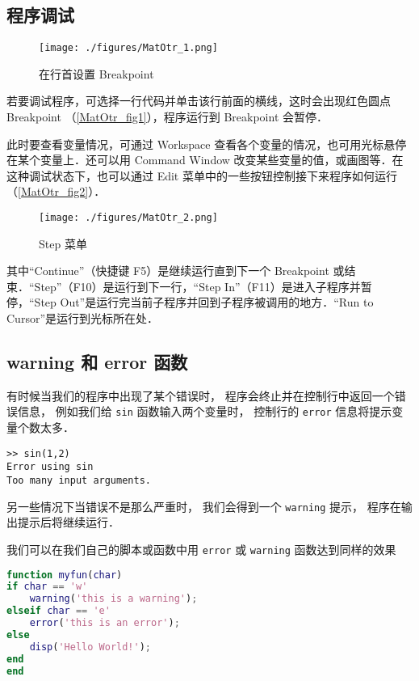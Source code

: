 

\subsection{程序调试}
\begin{figure}[ht]
\centering
\texttt{[image: ./figures/MatOtr\_1.png]}
\caption{在行首设置 Breakpoint}\label{MatOtr_fig1}
\end{figure}

若要调试程序，可选择一行代码并单击该行前面的横线，这时会出现红色圆点 Breakpoint （\autoref{MatOtr_fig1}），程序运行到 Breakpoint 会暂停．

此时要查看变量情况，可通过 Workspace 查看各个变量的情况，也可用光标悬停在某个变量上．还可以用 Command Window 改变某些变量的值，或画图等．在这种调试状态下，也可以通过 Edit 菜单中的一些按钮控制接下来程序如何运行（\autoref{MatOtr_fig2}）．
\begin{figure}[ht]
\centering
\texttt{[image: ./figures/MatOtr\_2.png]}
\caption{Step 菜单}\label{MatOtr_fig2}
\end{figure}
其中“Continue”（快捷键 F5）是继续运行直到下一个 Breakpoint 或结束．“Step”（F10）是运行到下一行，“Step In”（F11）是进入子程序并暂停，“Step Out”是运行完当前子程序并回到子程序被调用的地方．“Run to Cursor”是运行到光标所在处．

\subsection{warning 和 error 函数}
有时候当我们的程序中出现了某个错误时， 程序会终止并在控制行中返回一个错误信息， 例如我们给 \verb|sin| 函数输入两个变量时， 控制行的 \verb|error| 信息将提示变量个数太多．
\begin{lstlisting}[language=matlabC]
>> sin(1,2)
Error using sin
Too many input arguments.
\end{lstlisting}
另一些情况下当错误不是那么严重时， 我们会得到一个 \verb|warning| 提示， 程序在输出提示后将继续运行．

我们可以在我们自己的脚本或函数中用 \verb|error| 或 \verb|warning| 函数达到同样的效果

\begin{lstlisting}[language=matlab]
function myfun(char)
if char == 'w'
    warning('this is a warning');
elseif char == 'e'
    error('this is an error');
else
    disp('Hello World!');
end
end
\end{lstlisting}

